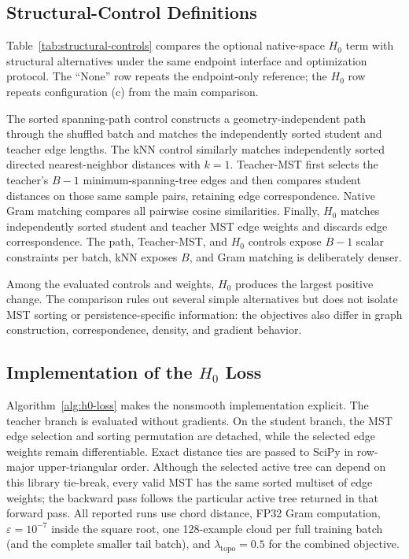 

\FloatBarrier
\subsection{Structural-Control Definitions}
\label{app:structural-control-definitions}

Table~\ref{tab:structural-controls} compares the optional native-space $H_0$
term with structural alternatives under the same endpoint interface and
optimization protocol. The ``None'' row repeats the endpoint-only reference;
the $H_0$ row repeats configuration (c) from the main comparison.



The sorted spanning-path control constructs a geometry-independent path through
the shuffled batch and matches the independently sorted student and teacher
edge lengths. The kNN control similarly matches independently sorted directed
nearest-neighbor distances with $k=1$. Teacher-MST first selects the teacher's
$B-1$ minimum-spanning-tree edges and then compares student distances on those
same sample pairs, retaining edge correspondence. Native Gram matching compares
all pairwise cosine similarities. Finally, $H_0$ matches independently sorted
student and teacher MST edge weights and discards edge correspondence. The
path, Teacher-MST, and $H_0$ controls expose $B-1$ scalar constraints per batch,
kNN exposes $B$, and Gram matching is deliberately denser.

Among the evaluated controls and weights, $H_0$ produces the largest positive
change. The comparison rules out several simple alternatives but does not
isolate MST sorting or persistence-specific information: the objectives also
differ in graph construction, correspondence, density, and gradient behavior.

\FloatBarrier
\subsection{Implementation of the \texorpdfstring{$H_0$}{H0} Loss}
\label{app:h0-implementation}

Algorithm~\ref{alg:h0-loss} makes the nonsmooth implementation explicit. The
teacher branch is evaluated without gradients. On the student branch, the MST
edge selection and sorting permutation are detached, while the selected edge
weights remain differentiable. Exact distance ties are passed to SciPy in
row-major upper-triangular order. Although the selected active tree can depend
on this library tie-break, every valid MST has the same sorted multiset of edge
weights; the backward pass follows the particular active tree returned in that
forward pass. All reported runs use chord distance, FP32 Gram computation,
$\varepsilon=10^{-7}$ inside the square root, one 128-example cloud per full
training batch (and the complete smaller tail batch), and
$\lambda_{\mathrm{topo}}=0.5$ for the combined objective.


